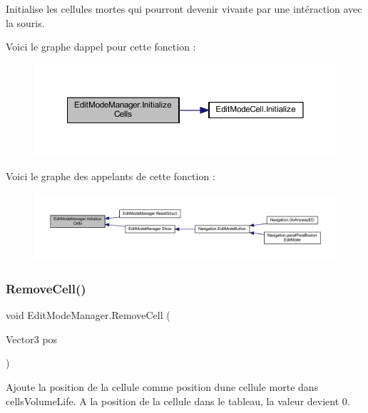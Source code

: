 Initialise les cellules mortes qui pourront devenir vivante par une intéraction avec la souris. 

Voici le graphe d\textquotesingle{}appel pour cette fonction \+:\nopagebreak
\begin{figure}[H]
\begin{center}
\leavevmode
\includegraphics[width=350pt]{class_edit_mode_manager_a8a950f58c809a7161d85e5d9a73e4d15_cgraph}
\end{center}
\end{figure}
Voici le graphe des appelants de cette fonction \+:
\nopagebreak
\begin{figure}[H]
\begin{center}
\leavevmode
\includegraphics[width=350pt]{class_edit_mode_manager_a8a950f58c809a7161d85e5d9a73e4d15_icgraph}
\end{center}
\end{figure}
\mbox{\label{class_edit_mode_manager_a8a8c1a3a9558fbbcfa7c15d8ce48a264}} 
\subsubsection{\texorpdfstring{Remove\+Cell()}{RemoveCell()}}
{\footnotesize\ttfamily void Edit\+Mode\+Manager.\+Remove\+Cell (\begin{DoxyParamCaption}\item[{Vector3}]{pos }\end{DoxyParamCaption})\hspace{0.3cm}{\ttfamily [inline]}}



Ajoute la position de la cellule comme position d\textquotesingle{}une cellule morte dans cells\+Volume\+Life. A la position de la cellule dans le tableau, la valeur devient 0. 


